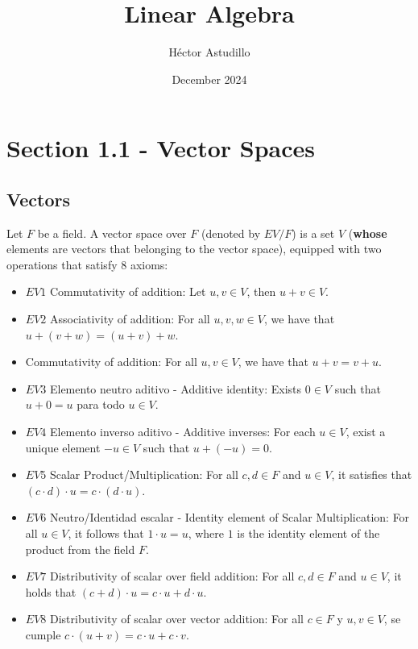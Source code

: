 \documentclass{article}
\title{Linear Algebra}
\author{Héctor Astudillo}
\date{December 2024}
\begin{document}
\maketitle

\section{Section 1.1 - Vector Spaces}
\subsection*{Vectors}
Let \( F \) be a field. A vector space over \( F \) (denoted by \( EV/F \)) is a set \( V \) (\textbf{whose} elements are vectors that belonging to the vector space), equipped with two operations that satisfy 8 axioms:

\begin{itemize}
    \item \(EV1\) Commutativity of addition: 
    Let \( u, v \in V \), then \( u + v \in V \).
    \item \(EV2\) Associativity of addition:
    For all \( u, v, w \in V \), we have that \( u + (v + w) = (u + v) + w \).
    \item Commutativity of addition: 
    For all \( u, v \in V \), we have that \( u + v = v + u \).
    \item \(EV3\) Elemento neutro aditivo - Additive identity: 
    Exists \( 0 \in V \) such that \( u + 0 = u \) para todo \( u \in V \).
    \item \(EV4\) Elemento inverso aditivo - Additive inverses:
    For each \( u \in V \), exist a unique element \( -u \in V \) such that \( u + (-u) = 0 \).
    \item \(EV5\) Scalar Product/Multiplication: 
    For all \( c, d \in F \) and \( u \in V \), it satisfies that \( (c \cdot d) \cdot u = c \cdot (d \cdot u) \).
    \item \(EV6\) Neutro/Identidad escalar - Identity element of Scalar Multiplication: 
    For all \( u \in V \), it follows that \( 1 \cdot u = u \), where \( 1 \) is the identity element of the product from the field \( F \).
    \item \(EV7\) Distributivity of scalar over field addition: 
    For all \( c, d \in F \) and \( u \in V \), it holds that \( (c + d) \cdot u = c \cdot u + d \cdot u \).
    \item \(EV8\) Distributivity of scalar over vector addition: 
    For all \( c \in F \) y \( u, v \in V \), se cumple \( c \cdot (u + v) = c \cdot u + c \cdot v \).
\end{itemize}
\end{document}

